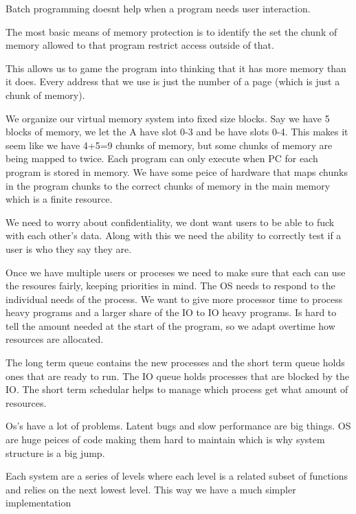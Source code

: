 \documentclass[12pt]{article}
\begin{document}

Batch programming doesnt help when a program needs user interaction.






The most basic means of memory protection is to identify the set the chunk of memory allowed to that program restrict access outside of that.




This allows us to game the program into thinking that it has more memory than it does. Every address that we use is just the number of a page (which is just a chunk of memory).

We organize our virtual memory system into fixed size blocks. Say we have 5 blocks of memory, we let the A have slot 0-3 and be have slots 0-4. This makes it seem like we have 4+5=9 chunks of memory, but some chunks of memory are being mapped to twice. Each program can only execute when PC for each program is stored in memory. We have some peice of hardware that maps chunks in the program chunks to the correct chunks of memory in the main memory which is a finite resource.



We need to worry about confidentiality, we dont want users to be able to fuck with each other's data. Along with this we need the ability to correctly test if a user is who they say they are.

Once we have multiple users or proceses we need to make sure that each can use the resoures fairly, keeping priorities in mind. The OS needs to respond to the individual needs of the process. We want to give more processor time to process heavy programs and a larger share of the IO to IO heavy programs. Is hard to tell the amount needed at the start of the program, so we adapt overtime how resources are allocated.


The long term queue contains the new processes and the short term queue holds ones that are ready to run. The IO queue holds processes that are blocked by the IO. The short term schedular helps to manage which process get what amount of resources.

Os's have a lot of problems. Latent bugs and slow performance are big things. OS are huge peices of code making them hard to maintain which is why system structure is a big jump.

Each system are a series of levels where each level is a related subset of functions and relies on the next lowest level. This way we have a much simpler implementation
\end{document}
